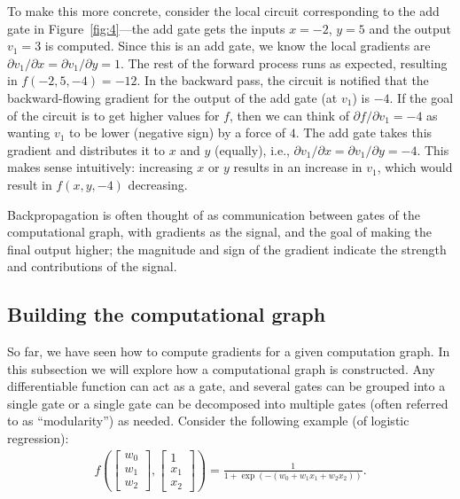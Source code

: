 To make this more concrete, consider the local circuit corresponding to the add gate in Figure~\ref{fig:4}---the add gate gets the inputs $x = -2$, $y = 5$ and the output $v_1 = 3$ is computed. Since this is an add gate, we know the local gradients are $\partial v_1 / \partial x = \partial v_1 / \partial y = 1$. The rest of the forward process runs as expected, resulting in $f(-2, 5, -4) = -12$. In the backward pass, the circuit is notified that the backward-flowing gradient for the output of the add gate (at $v_1$) is $-4$. If the goal of the circuit is to get higher values for $f$, then we can think of $\partial f / \partial v_1 = -4$ as wanting $v_1$ to be lower (negative sign) by a force of $4$. The add gate takes this gradient and distributes it to $x$ and $y$ (equally), i.e., $\partial v_1 / \partial x = \partial v_1 / \partial y = -4$. This makes sense intuitively: increasing $x$ or $y$ results in an increase in $v_1$, which would result in $f(x, y, -4)$ decreasing.

Backpropagation is often thought of as communication between gates of the computational graph, with gradients as the signal, and the goal of making the final output higher; the magnitude and sign of the gradient indicate the strength and contributions of the signal.

\subsection{Building the computational graph}
\label{sec:3.2}

So far, we have seen how to compute gradients for a given computation graph. In this subsection we will explore how a computational graph is constructed. Any differentiable function can act as a gate, and several gates can be grouped into a single gate or a single gate can be decomposed into multiple gates (often referred to as ``modularity'') as needed. Consider the following example (of logistic regression):
\begin{align}
\label{eq:11}
f\left(\begin{bmatrix}w_0 \\ w_1 \\ w_2\end{bmatrix}, \begin{bmatrix}1 \\ x_1 \\ x_2\end{bmatrix}\right) = \frac{1}{1 + \exp(-(w_0 + w_1 x_1 + w_2 x_2))}.
\end{align}

